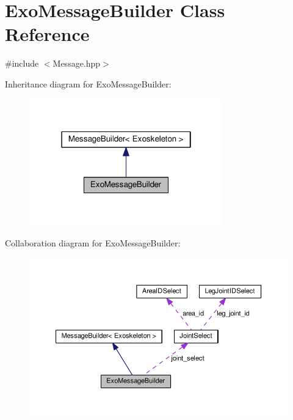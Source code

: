 \hypertarget{classExoMessageBuilder}{}\section{Exo\+Message\+Builder Class Reference}
\label{classExoMessageBuilder}


{\ttfamily \#include $<$Message.\+hpp$>$}



Inheritance diagram for Exo\+Message\+Builder\+:\nopagebreak
\begin{figure}[H]
\begin{center}
\leavevmode
\includegraphics[width=238pt]{classExoMessageBuilder__inherit__graph}
\end{center}
\end{figure}


Collaboration diagram for Exo\+Message\+Builder\+:
\nopagebreak
\begin{figure}[H]
\begin{center}
\leavevmode
\includegraphics[width=350pt]{classExoMessageBuilder__coll__graph}
\end{center}
\end{figure}
